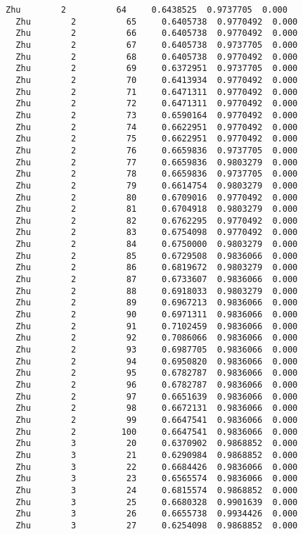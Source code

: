 \documentclass[11pt]{article}
\begin{document}
\begin{Verbatim}[commandchars=\\\{\}]
  Zhu        2          64     0.6438525  0.9737705  0.000
  Zhu        2          65     0.6405738  0.9770492  0.000
  Zhu        2          66     0.6405738  0.9770492  0.000
  Zhu        2          67     0.6405738  0.9737705  0.000
  Zhu        2          68     0.6405738  0.9770492  0.000
  Zhu        2          69     0.6372951  0.9737705  0.000
  Zhu        2          70     0.6413934  0.9770492  0.000
  Zhu        2          71     0.6471311  0.9770492  0.000
  Zhu        2          72     0.6471311  0.9770492  0.000
  Zhu        2          73     0.6590164  0.9770492  0.000
  Zhu        2          74     0.6622951  0.9770492  0.000
  Zhu        2          75     0.6622951  0.9770492  0.000
  Zhu        2          76     0.6659836  0.9737705  0.000
  Zhu        2          77     0.6659836  0.9803279  0.000
  Zhu        2          78     0.6659836  0.9737705  0.000
  Zhu        2          79     0.6614754  0.9803279  0.000
  Zhu        2          80     0.6709016  0.9770492  0.000
  Zhu        2          81     0.6704918  0.9803279  0.000
  Zhu        2          82     0.6762295  0.9770492  0.000
  Zhu        2          83     0.6754098  0.9770492  0.000
  Zhu        2          84     0.6750000  0.9803279  0.000
  Zhu        2          85     0.6729508  0.9836066  0.000
  Zhu        2          86     0.6819672  0.9803279  0.000
  Zhu        2          87     0.6733607  0.9836066  0.000
  Zhu        2          88     0.6918033  0.9803279  0.000
  Zhu        2          89     0.6967213  0.9836066  0.000
  Zhu        2          90     0.6971311  0.9836066  0.000
  Zhu        2          91     0.7102459  0.9836066  0.000
  Zhu        2          92     0.7086066  0.9836066  0.000
  Zhu        2          93     0.6987705  0.9836066  0.000
  Zhu        2          94     0.6950820  0.9836066  0.000
  Zhu        2          95     0.6782787  0.9836066  0.000
  Zhu        2          96     0.6782787  0.9836066  0.000
  Zhu        2          97     0.6651639  0.9836066  0.000
  Zhu        2          98     0.6672131  0.9836066  0.000
  Zhu        2          99     0.6647541  0.9836066  0.000
  Zhu        2         100     0.6647541  0.9836066  0.000
  Zhu        3          20     0.6370902  0.9868852  0.000
  Zhu        3          21     0.6290984  0.9868852  0.000
  Zhu        3          22     0.6684426  0.9836066  0.000
  Zhu        3          23     0.6565574  0.9836066  0.000
  Zhu        3          24     0.6815574  0.9868852  0.000
  Zhu        3          25     0.6680328  0.9901639  0.000
  Zhu        3          26     0.6655738  0.9934426  0.000
  Zhu        3          27     0.6254098  0.9868852  0.000

\end{Verbatim}
\end{document}
